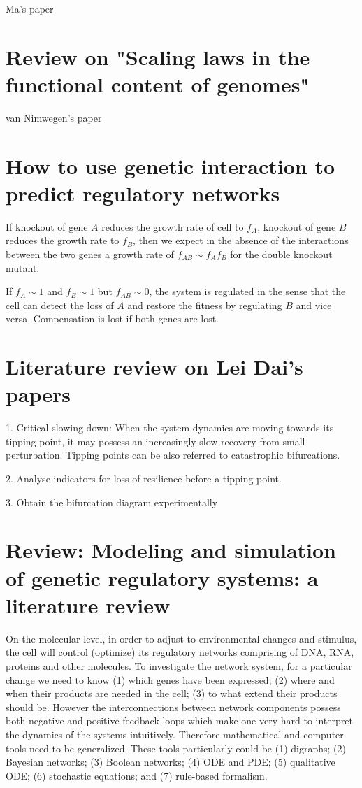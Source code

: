 \documentclass[paper=a4, fontsize=12pt]{scrartcl}	%
\numberwithin{equation}{section}					%
\numberwithin{figure}{section}					%
\numberwithin{table}{section}					%
\begin{document}
Ma's paper

\section{Review on "Scaling laws in the functional content of genomes"}

van Nimwegen's paper

\section{How to use genetic interaction to predict regulatory networks}
If knockout of gene $A$ reduces the growth rate of cell to $f_A$, knockout of gene $B$ reduces the growth rate to $f_B$, then we expect in the absence of the interactions between the two genes a growth rate of $f_{AB}\sim f_Af_B$ for the double knockout mutant. 

If $f_A\sim 1$ and $f_B\sim 1$ but $f_{AB}\sim 0$, the system is regulated in the sense that the cell can detect the loss of $A$ and restore the fitness by regulating $B$ and vice versa. Compensation is lost if both genes are lost. 

\section{Literature review on Lei Dai's papers}

1. Critical slowing down: When the system dynamics are moving towards its tipping point, it may possess an increasingly slow recovery from small perturbation. Tipping points can be also referred to catastrophic bifurcations. 

2. Analyse indicators for loss of resilience before a tipping point.

3. Obtain the bifurcation diagram experimentally


\section{Review: Modeling and simulation of genetic regulatory systems: a literature review}
On the molecular level, in order to adjust to environmental changes and stimulus, the cell will control (optimize) its regulatory networks comprising of DNA, RNA, proteins and other molecules. To investigate the network system, for a particular change we need to know (1) which genes have been expressed; (2) where and when their products are needed in the cell; (3) to what extend their products should be. However the interconnections between network components possess both negative and positive feedback loops which make one very hard to interpret the dynamics of the systems intuitively. Therefore mathematical and computer tools need to be generalized. These tools particularly could be (1) digraphs; (2) Bayesian networks; (3) Boolean networks; (4) ODE and PDE; (5) qualitative ODE; (6) stochastic equations; and (7) rule-based formalism. 
\end{document}
